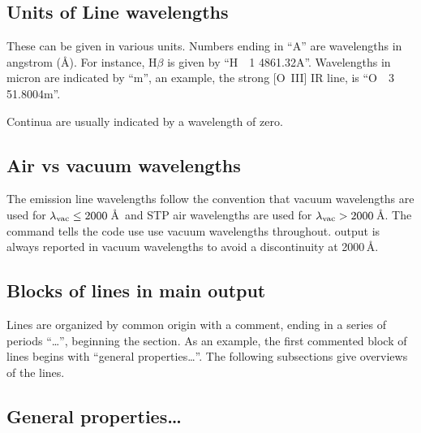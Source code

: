 \subsection{Units of Line wavelengths}
These can be given in various units.
Numbers ending
in ``A'' are wavelengths in angstrom (\AA).
For instance, H$\beta$ is given by ``H~~1  4861.32A''.
Wavelengths in micron are indicated by ``m'', an example,
the strong [O~III] IR line, is ``O~~3 51.8004m''.

Continua are usually
indicated by a wavelength of zero.

\subsection{Air vs vacuum wavelengths}

The emission line wavelengths follow the convention that vacuum wavelengths
are used for $\lambda_{\rm vac} \le 2000$\,\AA\ and STP air wavelengths are used
for $\lambda_{\rm vac} > 2000$\,\AA.
The  command tells the code use use vacuum wavelengths throughout.
 output is always reported in vacuum wavelengths to avoid 
a discontinuity at 2000\,\AA.

\subsection{Blocks of lines in main output}

Lines are organized by common origin with a comment, ending in a series
of periods ``\dots'', beginning the section.
As an example, the first
commented block of lines begins with ``general properties\dots''.
The
following subsections give overviews of the lines.

\subsection{General properties\dots}

